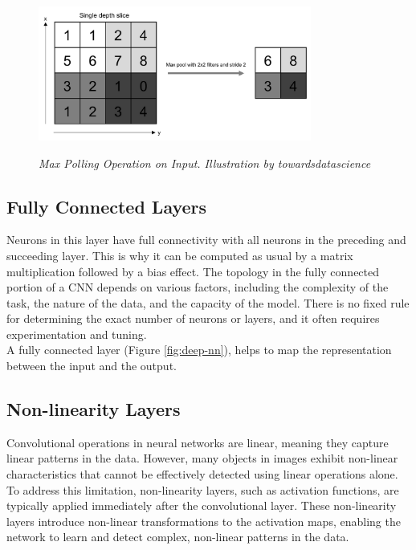 \begin{figure}[H]
  \centering
  \includegraphics[width=0.8\textwidth]{imatges/preliminaries/polling-layer.png}
  \caption[Max Polling Operation on Input]{\textit{Max Polling Operation on Input. Illustration by towardsdatascience}}
  {\label{fig:pooling-layer}}
\end{figure}

\subsection{Fully Connected Layers}

Neurons in this layer have full connectivity with all neurons in the preceding
and succeeding layer. This is why it can be computed as usual by a matrix
multiplication followed by a bias effect. The topology in the fully connected
portion of a CNN depends on various factors, including the complexity of the
task, the nature of the data, and the capacity of the model. There is no fixed
rule for determining the exact number of neurons or layers, and it often
requires experimentation and tuning. \\

A fully connected layer (Figure \ref{fig:deep-nn}), helps to map the
representation between the input and the output.

\subsection{Non-linearity Layers}

Convolutional operations in neural networks are linear, meaning they capture
linear patterns in the data. However, many objects in images exhibit non-linear
characteristics that cannot be effectively detected using linear operations
alone. To address this limitation, non-linearity layers, such as activation
functions, are typically applied immediately after the convolutional layer.
These non-linearity layers introduce non-linear transformations to the
activation maps, enabling the network to learn and detect complex, non-linear
patterns in the data. \\

